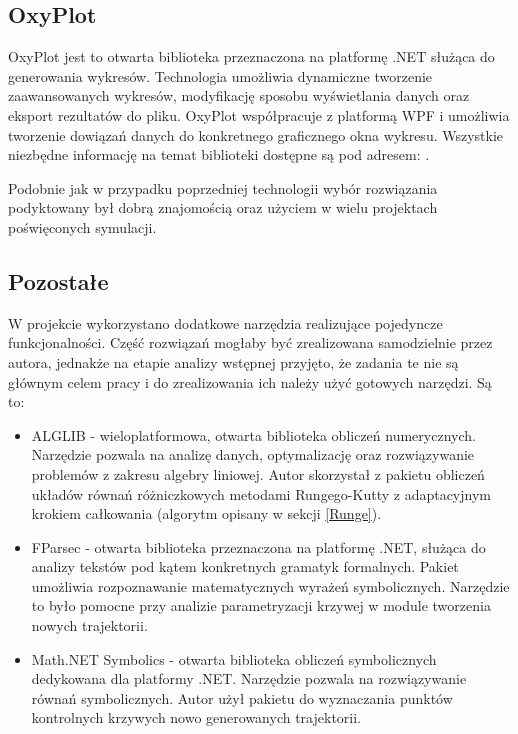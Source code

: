 \documentclass[12pt, oneside]{report}
\theoremstyle{definition}
\begin{document}
\subsection{OxyPlot}
OxyPlot jest to otwarta biblioteka przeznaczona na platformę .NET służąca do generowania wykresów. Technologia umożliwia dynamiczne tworzenie zaawansowanych wykresów, modyfikację sposobu wyświetlania danych oraz eksport rezultatów do pliku. OxyPlot współpracuje z platformą WPF i umożliwia tworzenie dowiązań danych do konkretnego graficznego okna wykresu. Wszystkie niezbędne informację na temat biblioteki dostępne są pod adresem: \cite{OxyPlot}.

Podobnie jak w przypadku poprzedniej technologii wybór rozwiązania podyktowany był dobrą znajomością oraz użyciem w wielu projektach poświęconych symulacji. 


\subsection{Pozostałe}
W projekcie wykorzystano dodatkowe narzędzia realizujące pojedyncze funkcjonalności. Część rozwiązań mogłaby być zrealizowana samodzielnie przez autora, jednakże na etapie analizy wstępnej przyjęto, że zadania te nie są głównym celem pracy i do zrealizowania ich należy użyć gotowych narzędzi. Są to:
\begin{itemize}
\item ALGLIB - wieloplatformowa, otwarta biblioteka obliczeń numerycznych. Narzędzie pozwala na analizę danych, optymalizację oraz rozwiązywanie problemów z zakresu algebry liniowej. Autor skorzystał z pakietu obliczeń układów równań różniczkowych metodami Rungego-Kutty z adaptacyjnym krokiem całkowania (algorytm opisany w sekcji \ref{Runge}). 
\item FParsec - otwarta biblioteka przeznaczona na platformę .NET, służąca do analizy tekstów pod kątem konkretnych gramatyk formalnych. Pakiet umożliwia rozpoznawanie matematycznych wyrażeń symbolicznych. Narzędzie to było pomocne przy analizie parametryzacji krzywej w module tworzenia nowych trajektorii.
\item Math.NET Symbolics - otwarta biblioteka obliczeń symbolicznych dedykowana dla platformy .NET. Narzędzie pozwala na rozwiązywanie równań symbolicznych. Autor użył pakietu do wyznaczania punktów kontrolnych krzywych nowo generowanych trajektorii.
\end{itemize}
\end{document}

